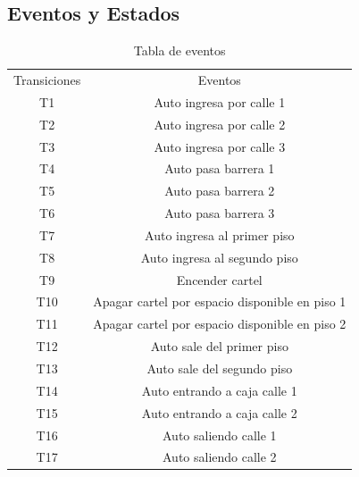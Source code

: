 \documentclass{article}
\begin{document}
	\subsection{Eventos y Estados}
	\begin{table}[h!]
		\begin{center}
		\begin{tabular}{ |c|c| } 
 			\hline
 			Transiciones & Eventos \\ 
 			T1 & Auto ingresa por calle 1 \\
 			T2 & Auto ingresa por calle 2 \\
 			T3 & Auto ingresa por calle 3 \\
 			T4 & Auto pasa barrera 1 \\
 			T5 & Auto pasa barrera 2 \\
 			T6 & Auto pasa barrera 3 \\ 
 			T7 & Auto ingresa al primer piso \\
 			T8 & Auto ingresa al segundo piso \\
 			T9 & Encender cartel \\
 			T10 & Apagar cartel por espacio disponible en piso 1 \\
 			T11 & Apagar cartel por espacio disponible en piso 2 \\
 			T12 & Auto sale del primer piso \\
 			T13 & Auto sale del segundo piso \\
 			T14 & Auto entrando a caja calle 1 \\
 			T15 & Auto entrando a caja calle 2 \\
 			T16 & Auto saliendo calle 1\\
 			T17 & Auto saliendo calle 2 \\ 
 			\hline
		\end{tabular}
		\end{center}
		\caption{Tabla de eventos}
		\label{table:eventos}
	\end{table}
	
\end{document}
